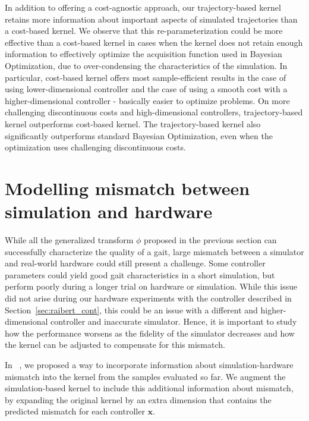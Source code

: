 In addition to offering a cost-agnostic approach, our trajectory-based kernel retains more information about important aspects of simulated trajectories than a cost-based  kernel. We observe that this re-parameterization could be more effective than a cost-based kernel in cases when the kernel does not retain enough information to effectively optimize the acquisition function used in Bayesian Optimization, due to over-condensing the characteristics of the simulation. In particular, cost-based kernel offers most sample-efficient results in the case of using lower-dimensional controller and the case of using a smooth cost with a higher-dimensional controller - basically easier to optimize problems. On more challenging discontinuous costs and high-dimensional controllers, trajectory-based kernel outperforms cost-based kernel.
The trajectory-based kernel also significantly outperforms standard Bayesian Optimization, even when the optimization uses challenging discontinuous costs. 


\section{Modelling mismatch between simulation and hardware}
\label{sec:mismatch}
While all the generalized transform $\phi$ proposed in the previous section can successfully characterize the quality of a gait, large mismatch between a simulator and real-world hardware could still present a challenge. Some controller parameters could yield good gait characteristics in a short simulation, but perform poorly during a longer trial on hardware or simulation. While this issue did not arise during our hardware experiments with the controller described in Section~\ref{sec:raibert_cont}, this could be an issue with a different and higher-dimensional controller and inaccurate simulator. Hence, it is important to study how the performance worsens as the fidelity of the simulator decreases and how the kernel can be adjusted to compensate for this mismatch.

In ~\cite{rai2017bayesian}, we proposed a way to incorporate information about simulation-hardware mismatch into the kernel from the samples evaluated so far. We augment the simulation-based kernel to include this additional information about mismatch, by expanding the original kernel by an extra dimension that contains the predicted mismatch for each controller $\pmb{x}$.
 
